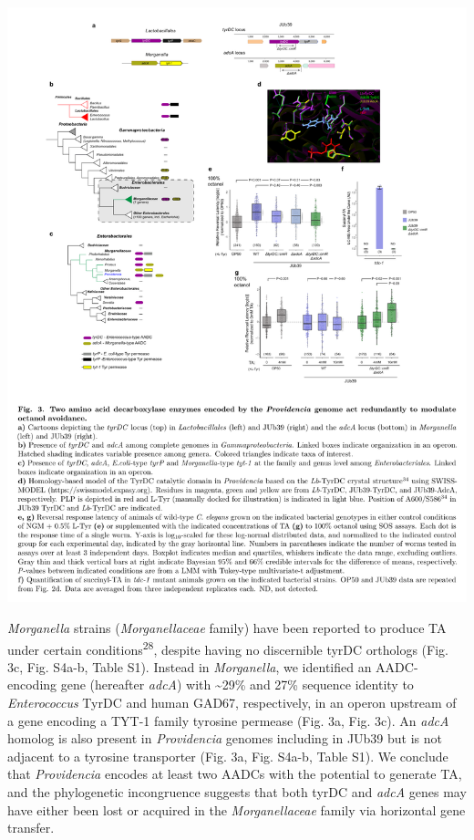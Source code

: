 \documentclass[11pt,]{article}
\begin{document}
\begin{flushleft}\includegraphics[width=1.1\linewidth]{Figure3} \end{flushleft}

\emph{Morganella} strains (\emph{Morganellaceae} family) have been
reported to produce TA under certain conditions\textsuperscript{28},
despite having no discernible tyrDC orthologs (Fig. 3c, Fig. S4a-b,
Table S1). Instead in \emph{Morganella}, we identified an AADC-encoding
gene (hereafter \emph{adcA}) with \textasciitilde{}29\% and 27\%
sequence identity to \emph{Enterococcus} TyrDC and human GAD67,
respectively, in an operon upstream of a gene encoding a TYT-1 family
tyrosine permease (Fig. 3a, Fig. 3c). An \emph{adcA} homolog is also
present in \emph{Providencia} genomes including in JUb39 but is not
adjacent to a tyrosine transporter (Fig. 3a, Fig. S4a-b, Table S1). We
conclude that \emph{Providencia} encodes at least two AADCs with the
potential to generate TA, and the phylogenetic incongruence suggests
that both tyrDC and \emph{adcA} genes may have either been lost or
acquired in the \emph{Morganellaceae} family via horizontal gene
transfer.
\end{document}
